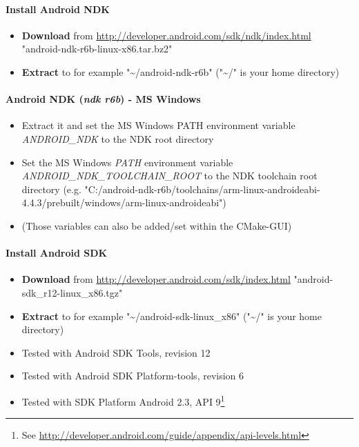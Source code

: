 \paragraph{Install Android \ac{NDK}}
\begin{itemize}
\item{\textbf{Download} from \url{http://developer.android.com/sdk/ndk/index.html} \textrightarrow{} "android-ndk-r6b-linux-x86.tar.bz2"}
\item{\textbf{Extract} to for example "\textasciitilde /android-ndk-r6b" ("\textasciitilde /" is your home directory)}
\end{itemize}


\paragraph{Android \ac{NDK} (\emph{ndk r6b}) - \ac{MS} Windows}
\begin{itemize}
\item{Extract it and set the \ac{MS} Windows PATH environment variable \emph{ANDROID\_NDK} to the \ac{NDK} root directory}
\item{Set the \ac{MS} Windows \emph{PATH} environment variable \emph{ANDROID\_NDK\_TOOLCHAIN\_ROOT} to the \ac{NDK} toolchain root directory (e.g. "C:/android-ndk-r6b/toolchains/arm-linux-androideabi-4.4.3/prebuilt/windows/arm-linux-androideabi")}
\item{(Those variables can also be added/set within the CMake-\ac{GUI})}
\end{itemize}


\paragraph{Install Android \ac{SDK}}
\begin{itemize}
\item{\textbf{Download} from \url{http://developer.android.com/sdk/index.html} \textrightarrow{} "android-sdk\_r12-linux\_x86.tgz"}
\item{\textbf{Extract} to for example "\textasciitilde /android-sdk-linux\_x86" ("\textasciitilde /" is your home directory)}
\item{Tested with Android \ac{SDK} Tools, revision 12}
\item{Tested with Android \ac{SDK} Platform-tools, revision 6}
\item{Tested with \ac{SDK} Platform Android 2.3, \ac{API} 9\footnote{See \url{http://developer.android.com/guide/appendix/api-levels.html}}}
\end{itemize}


